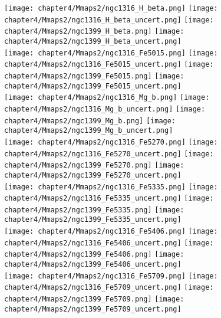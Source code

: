 \begin{figure*}
	\centering
	\texttt{[image: chapter4/Mmaps2/ngc1316\_H\_beta.png]}
	\texttt{[image: chapter4/Mmaps2/ngc1316\_H\_beta\_uncert.png]}
	\texttt{[image: chapter4/Mmaps2/ngc1399\_H\_beta.png]}
	\texttt{[image: chapter4/Mmaps2/ngc1399\_H\_beta\_uncert.png]}
	\\
	\texttt{[image: chapter4/Mmaps2/ngc1316\_Fe5015.png]}
	\texttt{[image: chapter4/Mmaps2/ngc1316\_Fe5015\_uncert.png]}
	\texttt{[image: chapter4/Mmaps2/ngc1399\_Fe5015.png]}
	\texttt{[image: chapter4/Mmaps2/ngc1399\_Fe5015\_uncert.png]}
	\\
	\texttt{[image: chapter4/Mmaps2/ngc1316\_Mg\_b.png]}
	\texttt{[image: chapter4/Mmaps2/ngc1316\_Mg\_b\_uncert.png]}
	\texttt{[image: chapter4/Mmaps2/ngc1399\_Mg\_b.png]}
	\texttt{[image: chapter4/Mmaps2/ngc1399\_Mg\_b\_uncert.png]}
	\\
	\texttt{[image: chapter4/Mmaps2/ngc1316\_Fe5270.png]}
	\texttt{[image: chapter4/Mmaps2/ngc1316\_Fe5270\_uncert.png]}
	\texttt{[image: chapter4/Mmaps2/ngc1399\_Fe5270.png]}
	\texttt{[image: chapter4/Mmaps2/ngc1399\_Fe5270\_uncert.png]}
	\\
	\texttt{[image: chapter4/Mmaps2/ngc1316\_Fe5335.png]}
	\texttt{[image: chapter4/Mmaps2/ngc1316\_Fe5335\_uncert.png]}
	\texttt{[image: chapter4/Mmaps2/ngc1399\_Fe5335.png]}
	\texttt{[image: chapter4/Mmaps2/ngc1399\_Fe5335\_uncert.png]}
	\\
	\texttt{[image: chapter4/Mmaps2/ngc1316\_Fe5406.png]}
	\texttt{[image: chapter4/Mmaps2/ngc1316\_Fe5406\_uncert.png]}
	\texttt{[image: chapter4/Mmaps2/ngc1399\_Fe5406.png]}
	\texttt{[image: chapter4/Mmaps2/ngc1399\_Fe5406\_uncert.png]}
	\\
	\texttt{[image: chapter4/Mmaps2/ngc1316\_Fe5709.png]}
	\texttt{[image: chapter4/Mmaps2/ngc1316\_Fe5709\_uncert.png]}
	\texttt{[image: chapter4/Mmaps2/ngc1399\_Fe5709.png]}
	\texttt{[image: chapter4/Mmaps2/ngc1399\_Fe5709\_uncert.png]}
	\\
\end{figure*}

